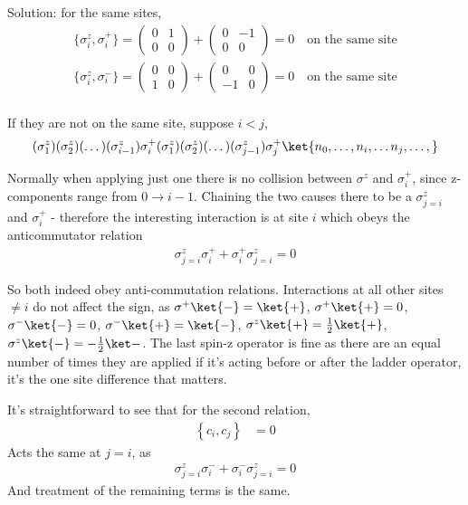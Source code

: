 \begin{homeworkProblem}
\begin{callout}{Solution:}
for the same sites,
\begin{align*}
    \{ \sigma_i^{z}, \sigma_i^+ \} = \begin{pmatrix} 0 & 1 \\ 0 & 0 \end{pmatrix} + \begin{pmatrix} 0 & -1 \\ 0 & 0 \end{pmatrix} = 0\quad \text{on the same site} \\ 
    \{ \sigma_i^{z}, \sigma_i^- \} = \begin{pmatrix} 0 & 0 \\ 1 & 0 \end{pmatrix} + \begin{pmatrix} 0 & 0 \\ -1 & 0 \end{pmatrix} = 0\quad \text{on the same site} \\ 
\end{align*}

If they are not on the same site, suppose $i<j$,
\begin{align*}
    (\sigma_1^{z})(\sigma_2^{z})(\dots)(\sigma_{i-1}^{z})\sigma_{i}^{+}
    (\sigma_1^{z})(\sigma_2^{z})(\dots)(\sigma_{j-1}^{z})\sigma_{j}^{+}
    \ket{n_{0},\dots, n_i,\dots n_j, \dots,}
\end{align*}

Normally when applying just one there is no collision between $\sigma^z$ and $\sigma^+_i$, since z-components range from $0\to i-1$. Chaining the two causes there to be a $\sigma_{j=i}^z$ and $\sigma_{i}^+$ - therefore the interesting interaction is at site $i$ which obeys the anticommutator relation
\begin{align*}
    \sigma_{j=i}^{z} \sigma^+_i + \sigma^+_i \sigma_{j=i}^{z} = 0
\end{align*}

So both indeed obey anti-commutation relations. Interactions at all other sites $\neq i$ do not affect the sign, as $\sigma^+\ket{-}=\ket{+}$, $\sigma^+\ket{+}=0$, $\sigma^-\ket{-}=0$, $\sigma^-\ket{+}=\ket{-}$, $\sigma^z\ket{+}= \frac{1}{2} \ket{+}$, $\sigma^z\ket{-}=-\frac{1}{2}\ket -$. The last spin-z operator is fine as there are an equal number of times they are applied if it's acting before or after the ladder operator, it's the one site difference that matters.


It's straightforward to see that for the second relation,
\begin{align*}
    \left\{c_i, c_j\right\}&=0
\end{align*}
Acts the same at $j=i$, as 
\begin{align*}
    \sigma^z_{j=i}\sigma^-_i + \sigma^-_i\sigma^z_{j=i} = 0
\end{align*}
And treatment of the remaining terms is the same.


\end{callout}
\end{homeworkProblem}
